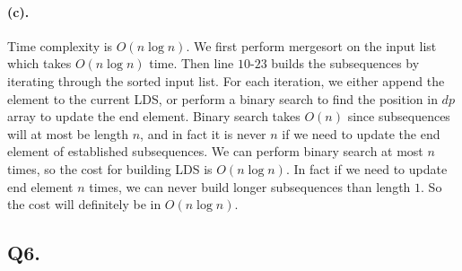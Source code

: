 \documentclass[12pt]{article}
\begin{document}
\paragraph{(c).} Time complexity is \(O(n\log n)\). We first perform mergesort on the input list which takes \(O(n\log n)\) time. Then line \(10\text{-}23\) builds the subsequences by iterating through the sorted input list. For each iteration, we either append the element to the current LDS, or perform a binary search to find the position in \(dp\) array to update the end element. Binary search takes \(O(n)\) since subsequences will at most be length \(n\), and in fact it is never \(n\) if we need to update the end element of established subsequences. We can perform binary search at most \(n\) times, so the cost for building LDS is \(O(n\log n)\). In fact if we need to update end element \(n\) times, we can never build longer subsequences than length \(1\). So the cost will definitely be in \(O(n\log n)\).

\subsection*{Q6.}
\end{document}
